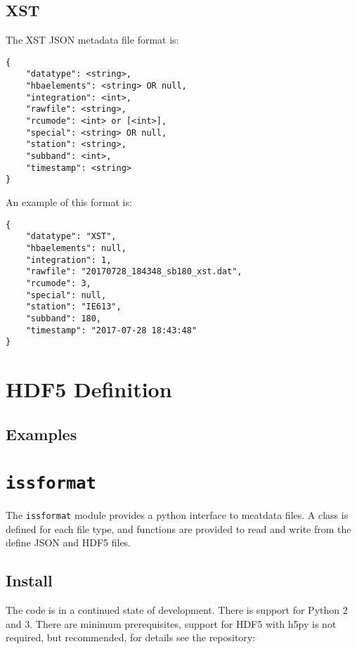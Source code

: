 \documentclass[10pt,a4paper]{article}
\begin{document}
\subsection{XST}

The XST JSON metadata file format is:

\begin{verbatim}
{
    "datatype": <string>,
    "hbaelements": <string> OR null,
    "integration": <int>,
    "rawfile": <string>,
    "rcumode": <int> or [<int>],
    "special": <string> OR null,
    "station": <string>,
    "subband": <int>,
    "timestamp": <string>
}
\end{verbatim}

\noindent An example of this format is:

\begin{verbatim}
{
    "datatype": "XST",
    "hbaelements": null,
    "integration": 1,
    "rawfile": "20170728_184348_sb180_xst.dat",
    "rcumode": 3,
    "special": null,
    "station": "IE613",
    "subband": 180,
    "timestamp": "2017-07-28 18:43:48"
}
\end{verbatim}

\section{HDF5 Definition}


\subsection{Examples}

\section{\texttt{issformat}}

The \texttt{issformat} module provides a python interface to meatdata files. A
class is defined for each file type, and functions are provided to read and
write from the define JSON and HDF5 files. 

\subsection{Install}

The code is in a continued state of development. There is support for Python 2
and 3. There are minimum prerequisites, support for HDF5 with h5py is not
required, but recommended, for details see the repository:
\end{document}
